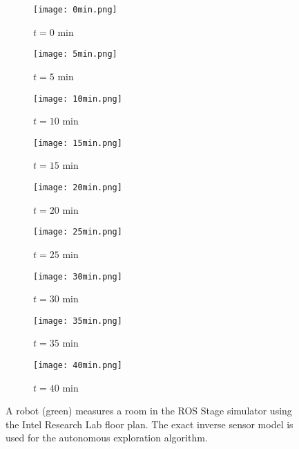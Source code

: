 \begin{figure}[!ht]
    \centering
    \begin{subfigure}[t]{0.3\columnwidth}
        \centering
        \texttt{[image: 0min.png]}
        \caption{$t=0$ min}
        \label{fig:IRL0min}
    \end{subfigure}
    \begin{subfigure}[t]{0.3\columnwidth}
        \centering
        \texttt{[image: 5min.png]}
        \caption{$t=5$ min}
        \label{fig:IRL5min}
    \end{subfigure}
    \begin{subfigure}[t]{0.3\columnwidth}
           \centering
           \texttt{[image: 10min.png]}
        \caption{$t=10$ min}
        \label{fig:IRL10min}
    \end{subfigure}
    \begin{subfigure}[t]{0.3\columnwidth}
           \centering
           \texttt{[image: 15min.png]}
        \caption{$t=15$ min}
        \label{fig:IRL15min}
    \end{subfigure}
    \begin{subfigure}[t]{0.3\columnwidth}
         \centering
         \texttt{[image: 20min.png]}
        \caption{$t=20$ min}
        \label{fig:IRL20min}
    \end{subfigure}
    \begin{subfigure}[t]{0.3\columnwidth}
           \centering
           \texttt{[image: 25min.png]}
        \caption{$t=25$ min}
        \label{fig:IRL25min}
    \end{subfigure}
    \begin{subfigure}[t]{0.3\columnwidth}
           \centering
           \texttt{[image: 30min.png]}
        \caption{$t=30$ min}
        \label{fig:IRL30min}
    \end{subfigure}
    \begin{subfigure}[t]{0.3\columnwidth}
           \centering
           \texttt{[image: 35min.png]}
        \caption{$t=35$ min}
        \label{fig:IRL35min}
    \end{subfigure}
    \begin{subfigure}[t]{0.3\columnwidth}
           \centering
           \texttt{[image: 40min.png]}
        \caption{$t=40$ min}
        \label{fig:IRL40min}
    \end{subfigure}
    \caption{A robot (green) measures a room in the ROS Stage simulator using the Intel Research Lab floor plan. The exact inverse sensor model is used for the autonomous exploration algorithm.}
    \label{fig:IRL}
\end{figure}



